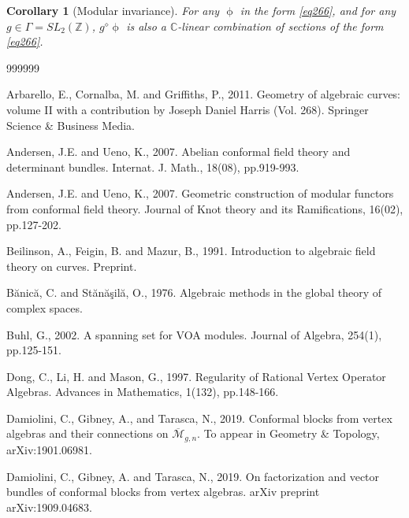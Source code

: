 \documentclass[12pt,b5paper,notitlepage]{report}
\theoremstyle{definition}
\theoremstyle{plain}
\newtheorem{co}[df]{Corollary}
\newcommand{\mc}{\mathcal}
\newcommand{\ovl}{\overline}
\newcommand{\Cbb}{\mathbb C}
\newcommand{\Zbb}{\mathbb Z}
\numberwithin{equation}{section}
\begin{document}
\begin{co}[Modular invariance]
For any $\upphi$ in the form \eqref{eq266}, and for any $g\in\Gamma=SL_2(\Zbb)$, $g^\diamond\upphi$ is also a $\Cbb$-linear combination of sections of the form \eqref{eq266}.
\end{co}


\printindex

\newpage

\begin{thebibliography}{999999}
\footnotesize	





Arbarello, E., Cornalba, M. and Griffiths, P., 2011. Geometry of algebraic curves: volume II with a contribution by Joseph Daniel Harris (Vol. 268). Springer Science \& Business Media.

Andersen, J.E. and Ueno, K., 2007. Abelian conformal field theory and determinant bundles. Internat. J.  Math., 18(08), pp.919-993.

Andersen, J.E. and Ueno, K., 2007. Geometric construction of modular functors from conformal field theory. Journal of Knot theory and its Ramifications, 16(02), pp.127-202.

Beilinson, A., Feigin, B. and Mazur, B., 1991. Introduction to algebraic field theory on curves. Preprint.

Bănică, C. and Stănăşilă, O., 1976. Algebraic methods in the global theory of complex spaces.

Buhl, G., 2002. A spanning set for VOA modules. Journal of Algebra, 254(1), pp.125-151.

Dong, C., Li, H. and Mason, G., 1997. Regularity of Rational Vertex Operator Algebras. Advances in Mathematics, 1(132), pp.148-166.

Damiolini, C., Gibney, A., and Tarasca, N., 2019. Conformal blocks from vertex algebras and their connections on $\ovl{\mc M}_{g,n}$.  To appear in Geometry \& Topology, arXiv:1901.06981.

Damiolini, C., Gibney, A. and Tarasca, N., 2019. On factorization and vector bundles of conformal blocks from vertex algebras. arXiv preprint arXiv:1909.04683.


\end{thebibliography}
\end{document}
